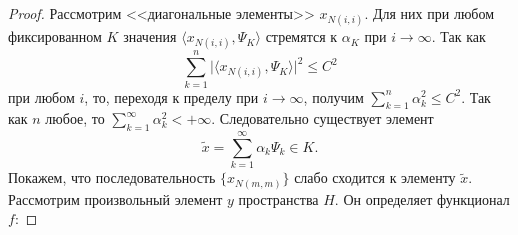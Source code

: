 \documentclass[12pt,a4paper,titlepage,oneside]{book}
\theoremstyle{definition}
\theoremstyle{plain}
\theoremstyle{break}
\theoremstyle{remark}
\theoremstyle{remark}
\theoremstyle{remark}
\theoremstyle{remark}
\theoremstyle{plain}
\theoremstyle{plain}
\begin{document}
\begin{proof}
Рассмотрим <<диагональные элементы>> $ x_{N(i,i)}$. Для них при любом фиксированном $K$ значения $\langle x_{N(i,i)},\Psi_K \rangle $ стремятся к $\alpha_K$ при  $i \to \infty$. Так как
\begin{equation*}
 \sum\limits_{k=1}^n 
{\big\vert \langle x_{N(i,i)},\Psi_K \rangle \big\vert}^2 \leqslant C^2
\end{equation*}
при любом $i$, то, переходя к пределу при $i\to\infty$, получим $\sum\limits_{k=1}^n \alpha_k^2 \leqslant C^2$. Так как $n$ любое, то $\sum\limits_{k=1}^\infty \alpha_k^2 <+\infty$. Следовательно существует элемент 
\begin{equation*}
\widetilde{x}= \sum\limits_{k=1}^\infty 
\alpha_k\Psi_{k} \in K.
\end{equation*}
Покажем, что последовательность $\lbrace x_{N(m,m)} \rbrace$ слабо сходится к элементу $\widetilde{x}$. Рассмотрим произвольный элемент $y$ пространства $H$. Он определяет функционал $f$:
 

\end{proof}
\end{document}
